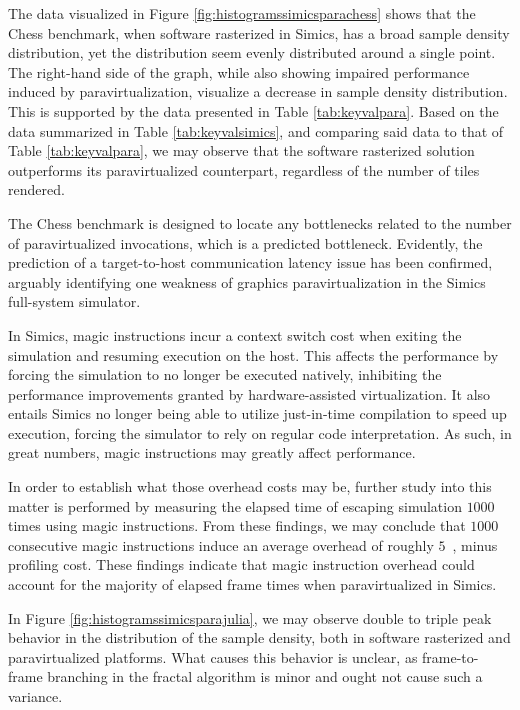 The data visualized in Figure \ref{fig:histogramssimicsparachess} shows that the Chess benchmark, when software rasterized in Simics, has a broad sample density distribution, yet the distribution seem evenly distributed around a single point.
The right-hand side of the graph, while also showing impaired performance induced by paravirtualization, visualize a decrease in sample density distribution.
This is supported by the data presented in Table \ref{tab:keyvalpara}.
Based on the data summarized in Table \ref{tab:keyvalsimics}, and comparing said data to that of Table \ref{tab:keyvalpara}, we may observe that the software rasterized solution outperforms its paravirtualized counterpart, regardless of the number of tiles rendered.

The Chess benchmark is designed to locate any bottlenecks related to the number of paravirtualized invocations, which is a predicted bottleneck.
Evidently, the prediction of a target-to-host communication latency issue has been confirmed, arguably identifying one weakness of graphics paravirtualization in the Simics full-system simulator.

In Simics, magic instructions incur a context switch cost when exiting the simulation and resuming execution on the host.
This affects the performance by forcing the simulation to no longer be executed natively, inhibiting the performance improvements granted by hardware-assisted virtualization.
It also entails Simics no longer being able to utilize just-in-time compilation to speed up execution, forcing the simulator to rely on regular code interpretation.
As such, in great numbers, magic instructions may greatly affect performance.

In order to establish what those overhead costs may be, further study into this matter is performed by measuring the elapsed time of escaping simulation $1000$ times using magic instructions.
From these findings, we may conclude that $1000$ consecutive magic instructions induce an average overhead of roughly $5$~\milli\second , minus profiling cost.
These findings indicate that magic instruction overhead could account for the majority of elapsed frame times when paravirtualized in Simics.

In Figure \ref{fig:histogramssimicsparajulia}, we may observe double to triple peak behavior in the distribution of the sample density, both in software rasterized and paravirtualized platforms.
What causes this behavior is unclear, as frame-to-frame branching in the fractal algorithm is minor and ought not cause such a variance.


